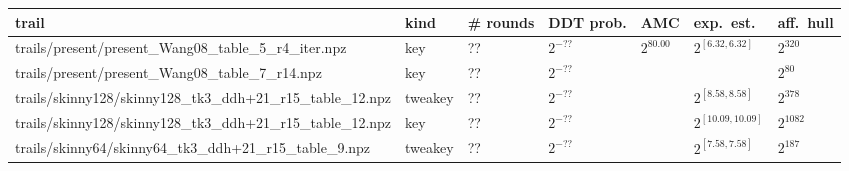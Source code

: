 \begin{tabular}{lllllll}
\hline
 trail                                                  & kind    & \# rounds   & DDT prob.   & AMC         & exp.\ est.\         & aff.\ hull   \\
\hline
 trails/present/present_Wang08_table_5_r4_iter.npz      & key     & ??          & $2^{-??}$   & $2^{80.00}$ & $2^{[6.32,6.32]}$   & $2^{320}$    \\
 trails/present/present_Wang08_table_7_r14.npz          & key     & ??          & $2^{-??}$   &             &                     & $2^{80}$     \\
 trails/skinny128/skinny128_tk3_ddh+21_r15_table_12.npz & tweakey & ??          & $2^{-??}$   &             & $2^{[8.58,8.58]}$   & $2^{378}$    \\
 trails/skinny128/skinny128_tk3_ddh+21_r15_table_12.npz & key     & ??          & $2^{-??}$   &             & $2^{[10.09,10.09]}$ & $2^{1082}$   \\
 trails/skinny64/skinny64_tk3_ddh+21_r15_table_9.npz    & tweakey & ??          & $2^{-??}$   &             & $2^{[7.58,7.58]}$   & $2^{187}$    \\
\hline
\end{tabular}
